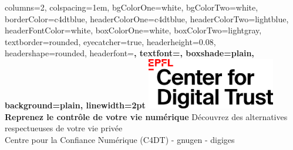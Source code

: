 \documentclass[a0paper,portrait]{baposter}
\begin{document}
\begin{poster}{
  columns=2,
  colspacing=1em,
  bgColorOne=white,
  bgColorTwo=white,
  borderColor=c4dtblue,
  headerColorOne=c4dtblue,
  headerColorTwo=lightblue,
  headerFontColor=white,
  boxColorOne=white,
  boxColorTwo=lightgray,
  textborder=rounded,
  eyecatcher=true,
  headerheight=0.08\textheight,
  headershape=rounded,
  headerfont=\Large\bf\textsf,
  textfont={\setlength{\parindent}{0em}\large},
  boxshade=plain,
  background=plain,
  linewidth=2pt
}
{\includegraphics[height=6em]{assets/logos/C4DT_logo.png}}
{\bf\textsf{\color{white}\huge Reprenez le contrôle de votre vie numérique}}
{\textsf{\color{white}\huge Découvrez des alternatives respectueuses de votre vie privée}\\
\vspace{0.5em}
\textsf{\color{white}\Large Centre pour la Confiance Numérique (C4DT) - gnugen - digiges}}
{\quad{}}

\end{poster}
\end{document}
